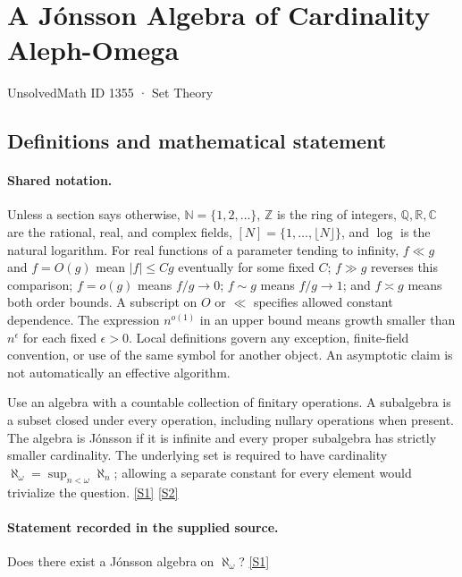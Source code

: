 \documentclass[11pt,a4paper]{article}
\newcommand{\N}{\mathbb{N}}
\newcommand{\Z}{\mathbb{Z}}
\newcommand{\Q}{\mathbb{Q}}
\newcommand{\R}{\mathbb{R}}
\newcommand{\C}{\mathbb{C}}
\newcommand{\sref}[2]{\hyperlink{source:#1:#2}{[S#2]}}
\begin{document}

\setcounter{section}{1354}

\section{A Jónsson Algebra of Cardinality Aleph-Omega}\label{1355}

{\small\sffamily UnsolvedMath ID 1355 · Set Theory}

\subsection{Definitions and mathematical statement}

\paragraph{Shared notation.}Unless a section says otherwise, $\N=\{1,2,\ldots\}$,
$\Z$ is the ring of integers, $\Q,\R,\C$ are the rational, real, and complex
fields, $[N]=\{1,\ldots,\lfloor N\rfloor\}$, and $\log$ is the natural
logarithm. For real functions of a parameter tending to infinity,
$f\ll g$ and $f=O(g)$ mean $|f|\leq Cg$ eventually for some fixed $C$;
$f\gg g$ reverses this comparison; $f=o(g)$ means $f/g\to0$;
$f\sim g$ means $f/g\to1$; and $f\asymp g$ means both order bounds.
A subscript on $O$ or $\ll$ specifies allowed constant dependence.
The expression $n^{o(1)}$ in an upper bound means growth smaller than
$n^\epsilon$ for each fixed $\epsilon>0$. Local definitions govern any
exception, finite-field convention, or use of the same symbol for another
object. An asymptotic claim is not automatically an effective algorithm.



Use an algebra with a countable collection of finitary operations. A subalgebra is a subset closed under every operation, including nullary operations when present. The algebra is Jónsson if it is infinite and every proper subalgebra has strictly smaller cardinality. The underlying set is required to have cardinality $\aleph_\omega=\sup_{n<\omega}\aleph_n$; allowing a separate constant for every element would trivialize the question. \sref{1355}{1} \sref{1355}{2}

\paragraph{Statement recorded in the supplied source.}
Does there exist a Jónsson algebra on $\aleph_\omega$? \sref{1355}{1}
\end{document}
